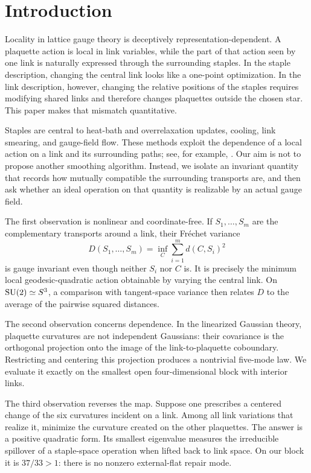 \section{Introduction}

Locality in lattice gauge theory is deceptively representation-dependent.  A
plaquette action is local in link variables, while the part of that action
seen by one link is naturally expressed through the surrounding staples.  In
the staple description, changing the central link looks like a one-point
optimization.  In the link description, however, changing the relative
positions of the staples requires modifying shared links and therefore
changes plaquettes outside the chosen star.  This paper makes that mismatch
quantitative.

Staples are central to heat-bath and overrelaxation updates, cooling, link
smearing, and gauge-field flow.  These methods exploit the dependence of a
local action on a link and its surrounding paths; see, for example,
\cite{Adler1981,BrownWoch1987,MorningstarPeardon2004,Luscher2010}.  Our aim is
not to propose another smoothing algorithm.  Instead, we isolate an invariant
quantity that records how mutually compatible the surrounding transports are,
and then ask whether an ideal operation on that quantity is realizable by an
actual gauge field.

The first observation is nonlinear and coordinate-free.  If $S_1,\ldots,S_m$
are the complementary transports around a link, their Fr\'echet variance
\[
  D(S_1,\ldots,S_m)=\inf_C\sum_{i=1}^m d(C,S_i)^2
\]
is gauge invariant even though neither $S_i$ nor $C$ is.  It is precisely the
minimum local geodesic-quadratic action obtainable by varying the central
link.  On $\mathrm{SU}(2)\simeq S^3$, a comparison with tangent-space variance then
relates $D$ to the average of the pairwise squared distances.

The second observation concerns dependence.  In the linearized Gaussian
theory, plaquette curvatures are not independent Gaussians: their covariance
is the orthogonal projection onto the image of the link-to-plaquette
coboundary.  Restricting and centering this projection produces a nontrivial
five-mode law.  We evaluate it exactly on the smallest open four-dimensional
block with interior links.

The third observation reverses the map.  Suppose one prescribes a centered
change of the six curvatures incident on a link.  Among all link variations
that realize it, minimize the curvature created on the other plaquettes.  The
answer is a positive quadratic form.  Its smallest eigenvalue measures the
irreducible spillover of a staple-space operation when lifted back to link
space.  On our block it is $37/33>1$: there is no nonzero external-flat
repair mode.

